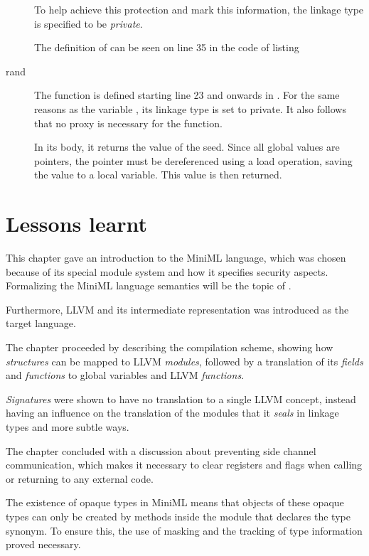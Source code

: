 \begin{description}
To help achieve this protection and mark this information, the linkage type is specified to be \emph{private}.

The definition of  can be seen on line 35 in the code of listing~
\item[rand] The function  is defined starting line 23 and onwards in . For the same reasons as the variable , its linkage type is set to private. It also follows that no proxy is necessary for the  function.

In its body, it returns the value of the seed. Since all global values are pointers, the pointer must be dereferenced using a load operation, saving the value to a local variable. This value is then returned.
\end{description}

\section{Lessons learnt}

This chapter gave an introduction to the \mbox{MiniML} language, which was chosen because of its special module system and how it specifies security aspects. Formalizing the \mbox{MiniML} language semantics will be the topic of \label{chapter:formalspecification}.

Furthermore, LLVM and its intermediate representation was introduced as the target language.

The chapter proceeded by describing the compilation scheme, showing how \emph{structures} can be mapped to LLVM \emph{modules}, followed by a translation of its \emph{fields} and \emph{functions} to global variables and LLVM \emph{functions}.

\emph{Signatures} were shown to have no translation to a single LLVM concept, instead having an influence on the translation of the modules that it \emph{seals} in linkage types and more subtle ways.

The chapter concluded with a discussion about preventing side channel communication, which makes it necessary to clear registers and flags when calling or returning to any external code.

The existence of opaque types in \mbox{MiniML} means that objects of these opaque types can only be created by methods inside the module that declares the type synonym. To ensure this, the use of masking and the tracking of type information proved necessary.

